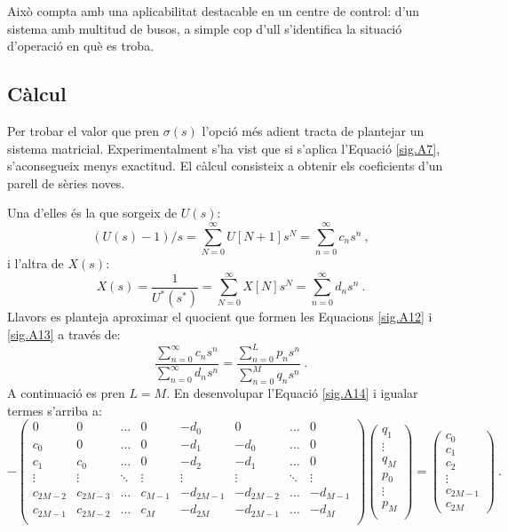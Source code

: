 Això compta amb una aplicabilitat destacable en un centre de control: d'un sistema amb multitud de busos, a simple cop d'ull s'identifica la situació d'operació en què es troba. 

\subsection{Càlcul}
Per trobar el valor que pren $\sigma(s)$ l'opció més adient tracta de plantejar un sistema matricial. Experimentalment s'ha vist que si s'aplica l'Equació \ref{sig.A7}, s'aconsegueix menys exactitud. El càlcul consisteix a obtenir els coeficients d'un parell de sèries noves. 

Una d'elles és la que sorgeix de $U(s)$:
\begin{equation}
    (U(s)-1)/s=\sum_{N=0}^{\infty}U[N+1]s^N=\sum_{n=0}^{\infty}c_ns^n\ ,
    \label{sig.A12}
\end{equation}
i l'altra de $X(s)$:
\begin{equation}
    X(s)=\frac{1}{U^*(s^*)}=\sum_{N=0}^{\infty}X[N]s^N=\sum_{n=0}^{\infty}d_ns^n\ .
    \label{sig.A13}
\end{equation}
Llavors es planteja aproximar el quocient que formen les Equacions \ref{sig.A12} i \ref{sig.A13} a través de:
\begin{equation}
    \frac{\sum_{n=0}^{\infty}c_ns^n}{\sum_{n=0}^{\infty}d_ns^n}=\frac{\sum_{n=0}^{L}p_ns^n}{\sum_{n=0}^{M}q_ns^n}\ .
    \label{sig.A14}
    \end{equation}
 A continuació es pren $L=M$. En desenvolupar l'Equació \ref{sig.A14} i igualar termes s'arriba a: 
 \begin{equation}
    -\begin{pmatrix}
    0 & 0 & \dots & 0 & -d_0 & 0 & \dots & 0 \\
    c_0 & 0 & \dots & 0 & -d_1 & -d_0 & \dots & 0\\
    c_1 & c_0 & \dots & 0 & -d_2 & -d_1 & \dots & 0\\
    \vdots & \vdots & \ddots & \vdots & \vdots & \vdots & \ddots & \vdots\\
    c_{2M-2} & c_{2M-3} & \dots & c_{M-1} & -d_{2M-1} & -d_{2M-2} & \dots & -d_{M-1}\\
    c_{2M-1} & c_{2M-2} & \dots & c_M & -d_{2M} & -d_{2M-1} & \dots & -d_{M}\\
    \end{pmatrix}
    \begin{pmatrix}
    q_1\\
    \vdots\\
    q_M\\
    p_0\\
    \vdots\\
    p_M\\
    \end{pmatrix}
    =
    \begin{pmatrix}
    c_0\\
    c_1\\
    c_2\\
    \vdots\\
    c_{2M-1}\\
    c_{2M}
    \end{pmatrix}\ .
    \label{sig.A15}
    \end{equation} 
